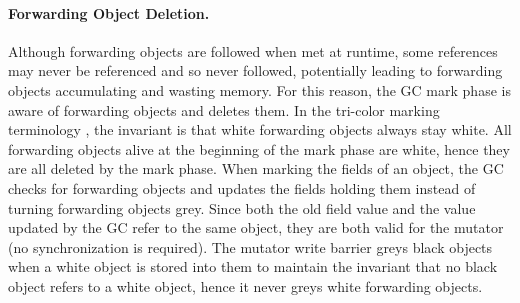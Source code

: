 \documentclass[sigplan,10pt,screen]{acmart}\settopmatter{printfolios=true,printccs=true,printacmref=true}
\newcommand{\eem}[1]{\color{olive}\fbox{\bfseries\sffamily\scriptsize Eliot:}{\sf\small$\blacktriangleright$\textit{#1}$\blacktriangleleft$}\color{black}}
\begin{document}

\paragraph{Forwarding Object Deletion.}

Although forwarding objects are followed when met at runtime, some references may never be referenced and so never followed, potentially leading to forwarding objects accumulating and wasting memory. For this reason, the GC mark phase is aware of forwarding objects and deletes them. In the tri-color marking terminology \cite{firstTriColorGC}, the invariant is that white forwarding objects always stay white. All forwarding objects alive at the beginning of the mark phase are white, hence they are all deleted by the mark phase. When marking the fields of an object, the GC checks for forwarding objects and updates the fields holding them instead of turning forwarding objects grey. Since both the old field value and the value updated by the GC refer to the same object, they are both valid for the mutator (no synchronization is required). The mutator write barrier greys black objects when a white object is stored into them to maintain the invariant that no black object refers to a white object, hence it never greys white forwarding objects.
\end{document}
